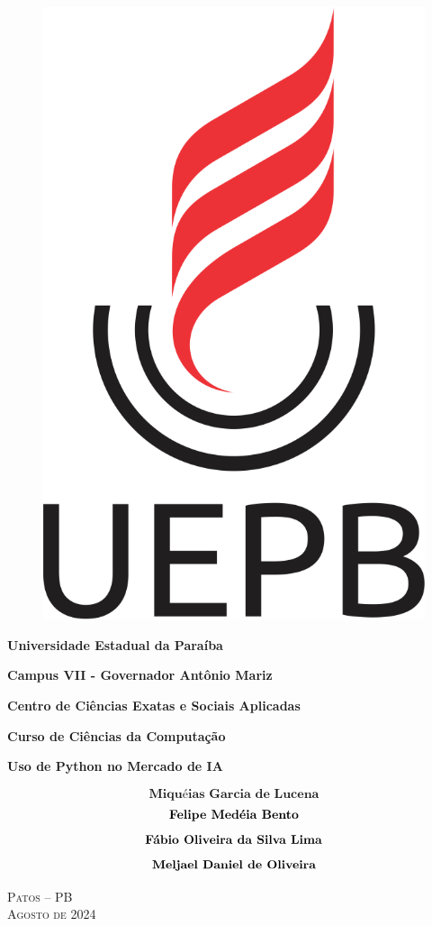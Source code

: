 \thispagestyle{empty}
\begin{center}

\begin{singlespace}
\begin{figure}[!htb]
    \centering
    \includegraphics[width=0.1\linewidth]{img/logo-uepb.png}
\end{figure}
{\Large{\textbf{ Universidade Estadual da Paraíba }}}

{\large{\textbf{ Campus VII - Governador Antônio Mariz }}}

{\large{\textbf{ Centro de Ciências Exatas e Sociais Aplicadas }}}

{\large{\textbf{ Curso de Ciências da Computação }}}
\end{singlespace}


\vspace{4.0cm}

\textbf{ \huge{{ Uso de Python no Mercado de IA }}}

\vspace {3cm}

{\Large{
    $$\textbf {Miquéias Garcia de Lucena}$$
    $$\newline\textbf {Felipe Medéia Bento}$$
    $$\newline\textbf {Fábio Oliveira da Silva Lima}$$
    $$\newline\textbf {Meljael Daniel de Oliveira}$$
}}

\vspace{3cm}

\begin{singlespace}

\large{\textsc{Patos -- PB}}\\
\large{\textsc{Agosto de 2024}}

\end{singlespace}

\end{center}

\pagebreak


\thispagestyle{empty}

